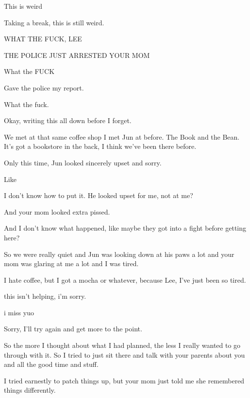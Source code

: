 { This is weird

 Taking a break, this is still weird.

 WHAT THE FUCK, LEE

 THE POLICE JUST ARRESTED YOUR MOM

 What the FUCK

 Gave the police my report.

 What the fuck.

 Okay, writing this all down before I forget.

 We met at that same coffee shop I met Jun at before. The Book and the Bean. It's got a bookstore in the back, I think we've been there before.

 Only this time, Jun looked sincerely upset and sorry.

 Like

 I don't know how to put it. He looked upset for me, not at me?

 And your mom looked extra pissed.

 And I don't know what happened, like maybe they got into a fight before getting here?

 So we were really quiet and Jun was looking down at his paws a lot and your mom was glaring at me a lot and I was tired.

 I hate coffee, but I got a mocha or whatever, because Lee, I've just been so tired.

 this isn't helping, i'm sorry.

 i miss yuo

 Sorry, I'll try again and get more to the point.

 So the more I thought about what I had planned, the less I really wanted to go through with it. So I tried to just sit there and talk with your parents about you and all the good time and stuff.

 I tried earnestly to patch things up, but your mom just told me she remembered things differently.

}
